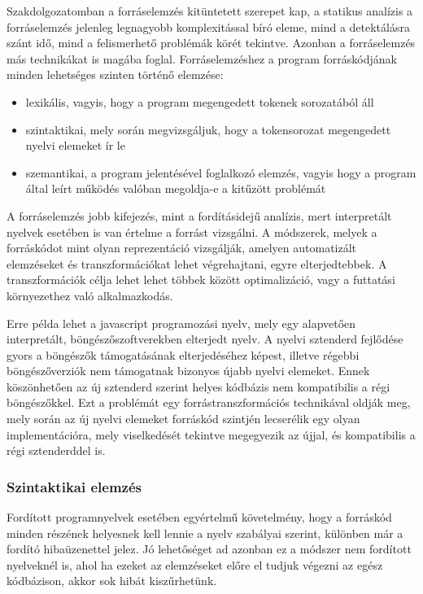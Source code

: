 \documentclass[a4paper,12pt]{report}
\begin{document}
Szakdolgozatomban a forráselemzés kitüntetett szerepet kap, a statikus analízis a forráselemzés jelenleg legnagyobb komplexitással bíró eleme, mind a detektálásra szánt idő, mind a felismerhető problémák körét tekintve. Azonban a forráselemzés más technikákat is magába foglal. Forráselemzéshez a program forráskódjának minden lehetséges szinten történő elemzése:
\begin{itemize}
\item lexikális, vagyis, hogy a program megengedett tokenek sorozatából áll
\item szintaktikai, mely során megvizsgáljuk, hogy a tokensorozat megengedett nyelvi elemeket ír le
\item szemantikai, a program jelentésével foglalkozó elemzés, vagyis hogy a program által leírt működés valóban megoldja-e a kitűzött problémát
\end{itemize}
A forráselemzés jobb kifejezés, mint a fordításidejű analízis, mert interpretált nyelvek esetében is van értelme a forrást vizsgálni. A módszerek, melyek a forráskódot mint olyan reprezentáció vizsgálják, amelyen automatizált elemzéseket és transzformációkat \cite{interpretedtransforms} lehet végrehajtani, egyre elterjedtebbek. A transzformációk célja lehet lehet többek között optimalizáció, vagy a futtatási környezethez való alkalmazkodás.

Erre példa lehet a javascript programozási nyelv, mely egy alapvetően interpretált, böngészőszoftverekben elterjedt nyelv. A nyelvi sztenderd fejlődése gyors a böngészők támogatásának elterjedéséhez képest, illetve régebbi böngészőverziók nem támogatnak bizonyos újabb nyelvi elemeket. Ennek köszönhetően az új sztenderd szerint helyes kódbázis nem kompatibilis a régi böngészőkkel. Ezt a problémát egy forrástranszformációs technikával \cite{transpilation} oldják meg, mely során az új nyelvi elemeket forráskód szintjén lecserélik egy olyan implementációra, mely viselkedését tekintve megegyezik az újjal, és kompatibilis a régi sztenderddel is.

\subsubsection{Szintaktikai elemzés}
Fordított programnyelvek esetében egyértelmű követelmény, hogy a forráskód minden részének helyesnek kell lennie a nyelv szabályai szerint, különben már a fordító hibaüzenettel jelez. Jó lehetőséget ad azonban ez a módszer nem fordított nyelveknél is, ahol ha ezeket az elemzéseket előre el tudjuk végezni az egész kódbázison, akkor sok hibát kiszűrhetünk.
\end{document}
